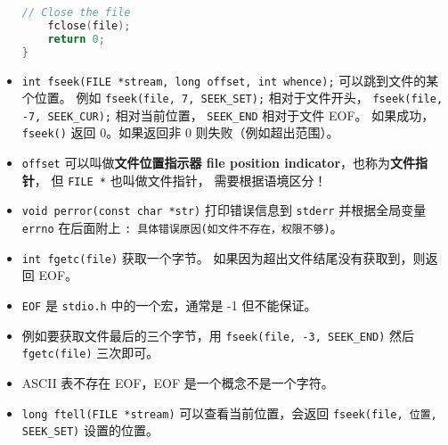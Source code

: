 \begin{itemize}
\begin{lstlisting}[language=cpp]
    // Close the file
    fclose(file);
    return 0;
}
\end{lstlisting}
\item \verb`int fseek(FILE *stream, long offset, int whence);` 可以跳到文件的某个位置。 例如 \verb`fseek(file, 7, SEEK_SET);` 相对于文件开头， \verb`fseek(file, -7, SEEK_CUR);` 相对当前位置， \verb`SEEK_END` 相对于文件 EOF。 如果成功，\verb`fseek()` 返回 0。如果返回非 0 则失败（例如超出范围）。
\item \verb`offset` 可以叫做\textbf{文件位置指示器 file position indicator}，也称为\textbf{文件指针}， 但 \verb`FILE *` 也叫做文件指针， 需要根据语境区分！
\item \verb`void perror(const char *str)` 打印错误信息到 \verb`stderr` 并根据全局变量 \verb`errno` 在后面附上 \verb`: 具体错误原因(如文件不存在，权限不够)`。
\item \verb`int fgetc(file)` 获取一个字节。 如果因为超出文件结尾没有获取到，则返回 EOF。
\item \verb`EOF` 是 \verb`stdio.h` 中的一个宏，通常是 -1 但不能保证。
\item 例如要获取文件最后的三个字节，用 \verb`fseek(file, -3, SEEK_END)` 然后 \verb`fgetc(file)` 三次即可。
\item ASCII 表不存在 EOF，EOF 是一个概念不是一个字符。
\item \verb`long ftell(FILE *stream)` 可以查看当前位置，会返回 \verb`fseek(file, 位置, SEEK_SET)` 设置的位置。
\end{itemize}

